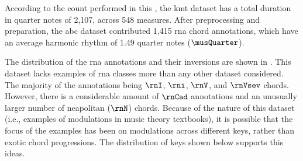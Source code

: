 
According to the count performed in this \thesisdiss{}, the
\gls{kmt} dataset has a total duration in quarter notes of
2,107, across 548 measures. After preprocessing and
preparation, the \gls{abc} dataset contributed 1,415
\gls{rna} chord annotations, which have an average harmonic
rhythm of 1.49 quarter notes ($\musQuarter$).

The distribution of the \gls{rna} annotations and their
inversions are shown in . This
dataset lacks examples of \gls{rna} classes more than any
other dataset considered. The majority of the annotations
being $\rnI$, $\rni$, $\rnV$, and $\rnVsev$ chords. However,
there is a considerable amount of $\rnCad$ annotations and
an unusually larger number of \gls{neapolitan} ($\rnN$)
chords. Because of the nature of this dataset (i.e.,
examples of modulations in music theory textbooks), it is
possible that the focus of the examples has been on
modulations across different keys, rather than exotic chord
progressions. The distribution of keys shown below supports
this ideas.




